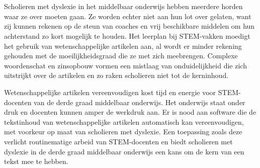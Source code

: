 \section{}%
\label{sec:probleemstelling}



Scholieren met dyslexie in het middelbaar onderwijs hebben meerdere horden waar ze over moeten gaan. Ze worden echter niet aan hun lot over gelaten, want zij kunnen rekenen op de steun van coaches en vrij beschikbare middelen om hun achterstand zo kort mogelijk te houden. Het leerplan bij STEM-vakken moedigt het gebruik van wetenschappelijke artikelen aan, al wordt er minder rekening gehouden met de moeilijkheidsgraad die ze met zich meebrengen. Complexe woordenschat en zinsopbouw vormen een mistlaag van onduidelijkheid die zich uitstrijkt over de artikelen en zo raken scholieren niet tot de kerninhoud.

Wetenschappelijke artikelen vereenvoudigen kost tijd en energie voor STEM-docenten van de derde graad middelbaar onderwijs. Het onderwijs staat onder druk en docenten kunnen amper de werkdruk aan. Er is nood aan software die de tekstinhoud van wetenschappelijke artikelen automatisch kan vereenvoudigen, met voorkeur op maat van scholieren met dyslexie. Een toepassing zoals deze verlicht routinematige arbeid van STEM-docenten en biedt scholieren met dyslexie in de derde graad middelbaar onderwijs een kans om de kern van een tekst mee te hebben.


\section{}%
\label{sec:onderzoeksvraag}


